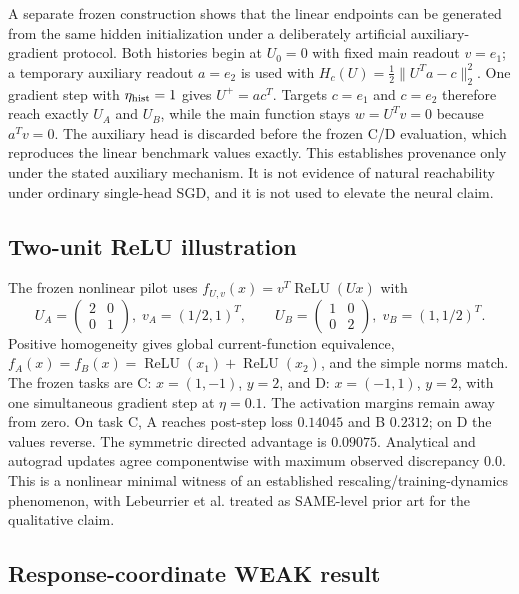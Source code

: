A separate frozen construction shows that the linear endpoints can be generated from the same hidden initialization under a deliberately artificial auxiliary-gradient protocol. Both histories begin at $U_0=0$ with fixed main readout $v=e_1$; a temporary auxiliary readout $a=e_2$ is used with $H_c(U)=\tfrac12\lVert U^Ta-c\rVert_2^2$. One gradient step with $\eta_{\rm hist}=1$ gives $U^+=ac^T$. Targets $c=e_1$ and $c=e_2$ therefore reach exactly $U_A$ and $U_B$, while the main function stays $w=U^Tv=0$ because $a^Tv=0$. The auxiliary head is discarded before the frozen C/D evaluation, which reproduces the linear benchmark values exactly. This establishes provenance only under the stated auxiliary mechanism. It is not evidence of natural reachability under ordinary single-head SGD, and it is not used to elevate the neural claim.

\subsection{Two-unit ReLU illustration}

The frozen nonlinear pilot uses $f_{U,v}(x)=v^T\operatorname{ReLU}(Ux)$ with
\begin{equation}
U_A=\begin{pmatrix}2&0\\0&1\end{pmatrix},\;v_A=(1/2,1)^T,\qquad U_B=\begin{pmatrix}1&0\\0&2\end{pmatrix},\;v_B=(1,1/2)^T.
\end{equation}
Positive homogeneity gives global current-function equivalence, $f_A(x)=f_B(x)=\operatorname{ReLU}(x_1)+\operatorname{ReLU}(x_2)$, and the simple norms match. The frozen tasks are C: $x=(1,-1)$, $y=2$, and D: $x=(-1,1)$, $y=2$, with one simultaneous gradient step at $\eta=0.1$. The activation margins remain away from zero. On task C, A reaches post-step loss $0.14045$ and B $0.2312$; on D the values reverse. The symmetric directed advantage is $0.09075$. Analytical and autograd updates agree componentwise with maximum observed discrepancy $0.0$. This is a nonlinear minimal witness of an established rescaling/training-dynamics phenomenon, with Lebeurrier et al. treated as SAME-level prior art for the qualitative claim.\cite{Lebeurrier2026}

\subsection{Response-coordinate WEAK result}

